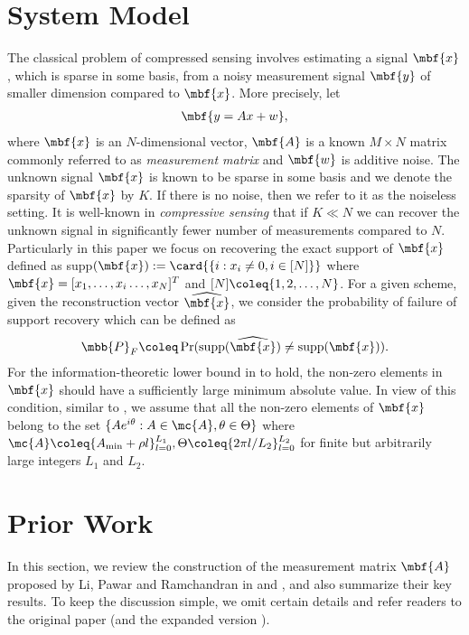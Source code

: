 \documentclass[conference]{IEEEtran}
\begin{document}
\section{System Model}
The classical problem of compressed sensing involves estimating a signal $\mbf{x}$, which is sparse in some basis, from a noisy measurement signal $\mbf{y}$ of smaller dimension compared to $\mbf{x}$. More precisely, let
\begin{align*}
\mbf{y=Ax+w},
\end{align*}
where $\mbf{x}$ is an $N$-dimensional vector, $\mbf{A}$ is a known $M \times N$ matrix commonly referred to as \emph{measurement matrix} and $\mbf{w}$ is additive noise. The unknown signal $\mbf{x}$ is known to be sparse in some basis and we denote the sparsity of $\mbf{x}$ by $K$. If there is no noise, then we refer to it as the noiseless setting. It is well-known in \emph{compressive sensing} that if $K \ll N$ we can recover the unknown signal in significantly fewer number of measurements compared to $N$.  Particularly in this paper we focus on recovering the exact support of $\mbf{x}$ defined as supp$(\mbf{x}):=\card{\{i:x_i\neq 0, i\in[N]\}}$ where $\mbf{x}=[x_1,\ldots , x_i \ldots ,x_N]^{T}$ and $[N]\coleq\{1,2,\ldots ,N\}$. For a given scheme, given the reconstruction vector $\widehat{\mbf{x}}$, we consider the probability of failure of support recovery which can be defined as
\begin{align*}
\mbb{P}_{F}\coleq\Pr(\text{supp}(\widehat{\mbf{x}})\neq \text{supp}(\mbf{x})).
\end{align*}
For the information-theoretic lower bound in \cite{wainwright2009information} to hold, the non-zero elements in $\mbf{x}$ should have a sufficiently large minimum absolute value. In view of this condition, similar to \cite{li2015subisit,li2015subdraft},
 we assume that all the non-zero elements of $\mbf{x}$ belong to the set $\{Ae^{i\theta}:A\in\mc{A},\theta\in\Theta\}$ where $\mc{A}\coleq \{A_{\text{min}}+\rho l\}^{L_1}_{l=0},\Theta\coleq\{2\pi l/L_2\}_{l=0}^{L_2}$ for finite but arbitrarily large integers $L_1$ and $L_2$.
\section{Prior Work }\label{Sec:Review}
In this section, we review the construction of the measurement matrix $\mbf{A}$ proposed by Li, Pawar and Ramchandran in \cite{li2015subisit} and \cite{li2015subdraft}, and also summarize their key results. To keep the discussion simple, we omit certain details and refer readers to the original paper \cite{li2015subisit} (and the expanded version  \cite{li2015subdraft}).
\end{document}
